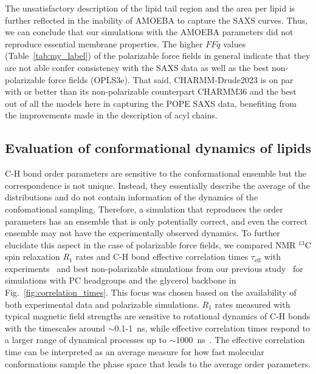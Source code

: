 \documentclass[journal=jacsat,manuscript=article,layout=singlecolumn]{achemso}
\begin{document}
The unsatisfactory description of the lipid tail region and the area per lipid is further reflected in the inability of AMOEBA to capture the SAXS curves. Thus, we can conclude that our simulations with the AMOEBA parameters did not reproduce essential
membrane properties. The higher $FFq$ values (Table~\ref{tab:my_label}) of the polarizable force fields in general indicate that they are not able confer consistency with the SAXS data as well as the best non-polarizable force fields (OPLS3e). That said, CHARMM-Drude2023 is on par with or better than its non-polarizable counterpart CHARMM36 and the best out of all the models here in capturing the POPE SAXS data, benefiting from the improvements made in the description of acyl chains.




\subsection{Evaluation of conformational dynamics of lipids}
C-H bond order parameters are sensitive to the conformational ensemble but the correspondence is not unique. Instead, they essentially describe the average of the distributions and do not contain information of the dynamics of the confomational sampling. Therefore, a simulation that reproduces the order parameters has an ensemble that is only potentially correct, and even the correct ensemble may not have the experimentally observed dynamics. To further elucidate this aspect in the case of polarizable force fields, we compared NMR $^{13}$C spin relaxation $R_{1}$ rates and C-H bond effective correlation times $\tau_{\mathrm{eff}}$ with experiments~\cite{ferreira15} and best non-polarizable simulations from our previous study~\cite{Antila2021} for simulations with PC headgroups and the glycerol backbone in Fig.~\ref{fig:correlation_times}. This focus was chosen based on the availability of both experimental data and polarizable simulations. $R_{1}$ rates measured with typical magnetic field strengths are sensitive to rotational dynamics of C-H bonds with the timescales around $\sim$0.1-1~ns, while effective correlation times respond to a larger range of dynamical processes up to $\sim$1000~ns~\cite{ferreira15}. The effective correlation time can be interpreted as an average measure for how fast molecular conformations sample the phase space that leads to the average order parameters.
\end{document}
